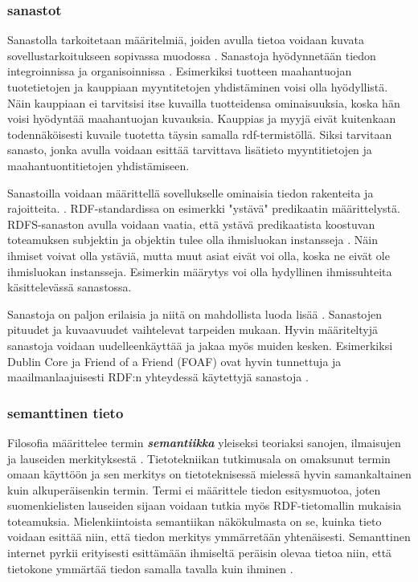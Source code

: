 \documentclass[finnish, 12pt, a4paper, elec, utf8, pdfa, online]{aaltothesis}
\begin{document}
\subsubsection{sanastot}
Sanastolla tarkoitetaan määritelmiä, joiden avulla tietoa voidaan kuvata sovellustarkoitukseen sopivassa muodossa \cite{RDF_specification}. Sanastoja hyödynnetään tiedon integroinnissa ja organisoinnissa \cite{vocabulary}. Esimerkiksi tuotteen maahantuojan tuotetietojen ja kauppiaan myyntitetojen yhdistäminen voisi olla hyödyllistä. Näin kauppiaan ei tarvitsisi itse kuvailla tuotteidensa ominaisuuksia, koska hän voisi hyödyntää maahantuojan kuvauksia. Kauppias ja myyjä eivät kuitenkaan todennäköisesti kuvaile tuotetta täysin samalla rdf-termistöllä. Siksi tarvitaan sanasto, jonka avulla voidaan esittää tarvittava lisätieto myyntitietojen ja maahantuontitietojen yhdistämiseen.

Sanastoilla voidaan määrittellä sovellukselle ominaisia tiedon rakenteita ja rajoitteita. \cite{vocabulary}. RDF-standardissa on esimerkki "ystävä" predikaatin määrittelystä. RDFS-sanaston avulla voidaan vaatia, että ystävä predikaatista koostuvan toteamuksen subjektin ja objektin tulee olla ihmisluokan instansseja \cite{RDF_specification}. Näin ihmiset voivat olla ystäviä, mutta muut asiat eivät voi olla, koska ne eivät ole ihmisluokan instansseja. Esimerkin määrytys voi olla hydyllinen ihmissuhteita käsittelevässä sanastossa.

Sanastoja on paljon erilaisia ja niitä on mahdollista luoda lisää \cite{RDF_specification}. Sanastojen pituudet ja kuvaavuudet vaihtelevat tarpeiden mukaan. Hyvin määriteltyjä sanastoja voidaan uudelleenkäyttää ja jakaa myös muiden kesken. Esimerkiksi Dublin Core ja Friend of a Friend (FOAF) ovat hyvin tunnettuja ja maailmanlaajuisesti RDF:n yhteydessä käytettyjä sanastoja \cite{data_namespace}.


\subsubsection{semanttinen tieto}

Filosofia määrittelee termin \textbf{\textit{semantiikka}} yleiseksi teoriaksi sanojen, ilmaisujen ja lauseiden merkityksestä \cite{semantics_phi}. Tietotekniikan tutkimusala on omaksunut termin omaan käyttöön ja sen merkitys on tietoteknisessä mielessä hyvin samankaltainen kuin alkuperäisenkin termin. Termi ei määrittele tiedon esitysmuotoa, joten suomenkielisten lauseiden sijaan voidaan tutkia myös RDF-tietomallin mukaisia toteamuksia. Mielenkiintoista semantiikan näkökulmasta on se, kuinka tieto voidaan esittää niin, että tiedon merkitys ymmärretään yhtenäisesti. Semanttinen internet pyrkii erityisesti esittämään ihmiseltä peräisin olevaa tietoa niin, että tietokone ymmärtää tiedon samalla tavalla kuin ihminen \cite{Berners_visio}.
\end{document}
